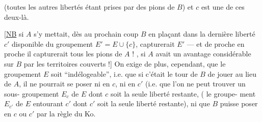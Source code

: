 (toutes les autres libertés étant prises par des
pions de $B$)  et $c$ est une de ces deux-là.

[\uline{NB} si $A$ s'y mettait, dès au prochain coup
$B$ en  plaçant dans la  dernière liberté
$c'$ disponible du groupement $E'=E\cup\{c\}$, capturerait
$E'$ --- et de proche en proche il capturerait
tous les pions de $A$ !\deleted{\unsure{]}} ,  si $A$ avait
un avantage considérable sur $B$ par les
territoires couverts !] On exige de plus,
cependant, que le groupement $E$ soit
``indélogeable'', i.e. que si c'était le
tour de $B$ de jouer au lieu de $A$, il ne
pourrait se poser ni en $c$, ni en $c'$
(i.e. que l'on ne peut trouver un sous-
groupement $E_c$ de $E$  dont $c$ soit la
seule liberté  restante, (  le groupe-
ment $E_{c'}$ de $E$ entourant $c'$ dont $c'$ soit
la seule liberté restante), ni que $B$
puisse poser en $c$ ou $c'$ par la règle du
Ko.
